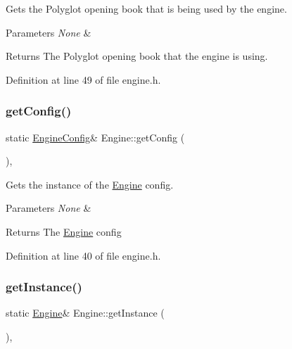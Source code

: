 Gets the Polyglot opening book that is being used by the engine. 


\begin{DoxyParams}{Parameters}
{\em None} & \\
\hline
\end{DoxyParams}
\begin{DoxyReturn}{Returns}
The Polyglot opening book that the engine is using. 
\end{DoxyReturn}


Definition at line 49 of file engine.\+h.

\mbox{\label{classEngine_a0829ed04a1463100784500122bbe426f}} 
\subsubsection{\texorpdfstring{get\+Config()}{getConfig()}}
{\footnotesize\ttfamily static \mbox{\hyperlink{structEngineConfig}{Engine\+Config}}\& Engine\+::get\+Config (\begin{DoxyParamCaption}{ }\end{DoxyParamCaption})\hspace{0.3cm}{\ttfamily [inline]}, {\ttfamily [static]}}



Gets the instance of the \mbox{\hyperlink{classEngine}{Engine}} config. 


\begin{DoxyParams}{Parameters}
{\em None} & \\
\hline
\end{DoxyParams}
\begin{DoxyReturn}{Returns}
The \mbox{\hyperlink{classEngine}{Engine}} config 
\end{DoxyReturn}


Definition at line 40 of file engine.\+h.

\mbox{\label{classEngine_ae174f8fa16fbab1633489283db2b0c9f}} 
\subsubsection{\texorpdfstring{get\+Instance()}{getInstance()}}
{\footnotesize\ttfamily static \mbox{\hyperlink{classEngine}{Engine}}\& Engine\+::get\+Instance (\begin{DoxyParamCaption}{ }\end{DoxyParamCaption})\hspace{0.3cm}{\ttfamily [inline]}, {\ttfamily [static]}}




